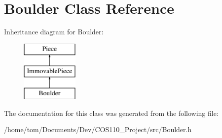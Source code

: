 \hypertarget{classBoulder}{\section{Boulder Class Reference}
\label{classBoulder}
}
Inheritance diagram for Boulder\-:\begin{figure}[H]
\begin{center}
\leavevmode
\includegraphics[height=3.000000cm]{classBoulder}
\end{center}
\end{figure}


The documentation for this class was generated from the following file\-:\begin{DoxyCompactItemize}
\item 
/home/tom/\-Documents/\-Dev/\-C\-O\-S110\-\_\-\-Project/src/Boulder.\-h\end{DoxyCompactItemize}
